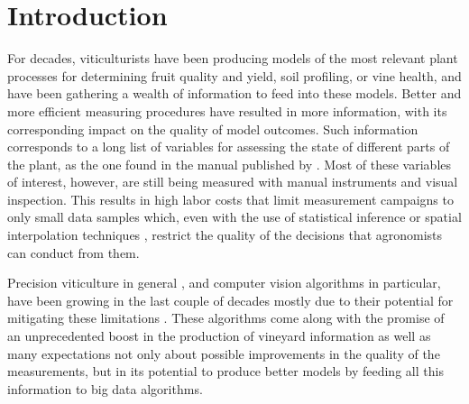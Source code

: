 \documentclass[a4paper,authoryear,review]{elsarticle}
\begin{document}
\linenumbers



\section{Introduction}

For decades, viticulturists have been producing models of the most relevant plant processes for determining fruit quality and yield, soil profiling, or vine health, and have been gathering a wealth of information to feed into these models. Better and more efficient measuring procedures have resulted in more information, with its corresponding impact on the quality of model outcomes. 
Such information corresponds to a long list of variables for assessing the state of different parts of the plant, as the one found in the manual published by \cite{awriNDmanual1, awriNDmanual3}.
Most of these variables of interest, however, are still being measured with manual instruments and visual inspection. This results in high labor costs that limit measurement campaigns to only small data samples which, even with the use of statistical inference or spatial interpolation techniques \citep{whelan1996spatial}, restrict the quality of the decisions that agronomists can conduct from them.


Precision viticulture in general \citep{bramley2009lessons}, and computer vision algorithms in particular, have been growing in the last couple of decades mostly due to their potential for mitigating these limitations \citep{seng2018computer, matese2015technology}. These algorithms come along with the promise of an unprecedented boost in the production of vineyard information as well as many expectations not only about possible improvements in the quality of the measurements, but in its potential to produce better models by feeding all this information to big data algorithms. 
\end{document}
